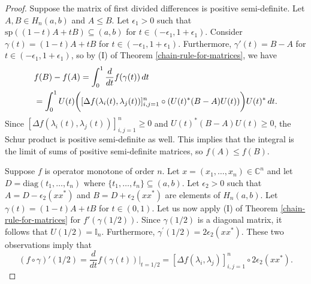 \documentclass[10pt,a4paper]{amsart}
\newcommand{\myabs}[1]{ | #1 | }
\begin{document}
	\begin{proof}
		Suppose the matrix of first divided differences is positive semi-definite. Let $A, B \in H_n(a, b)$ and $A \leq B$. Let $\epsilon_1 > 0$ such that $\text{sp}((1-t)A + tB) \subseteq (a, b)$ for $t \in (-\epsilon_1, 1 + \epsilon_1)$. Consider $\gamma(t) = (1-t)A + tB$ for $t \in (-\epsilon_1, 1 + \epsilon_1)$. Furthermore, $\gamma'(t) = B-A$ for $t \in (-\epsilon_1, 1 + \epsilon_1)$, so by (I) of Theorem \ref{chain-rule-for-matrices}, we have 
		\begin{align*}
			\begin{split}
				&f(B)-f(A) = \int_{0}^{1} \frac{d}{dt} f(\gamma(t)) \, \rm{d}t \\
				&= \int_{0}^{1} U(t) \bigg( [\Delta f(\lambda_i(t), \lambda_j(t))]_{i,j=1}^{n} \circ (U(t)^{*} (B-A) U(t)) \bigg)U(t)^{*} \, dt.
			\end{split}
		\end{align*}
		Since  $[\Delta f(\lambda_i(t), \lambda_j(t))]_{i,j=1}^{n}  \geq 0$ and $U(t)^{*} (B-A) U(t) \geq 0$, the Schur product is positive semi-definite as well. This implies that the integral is the limit of sums of positive semi-definite matrices, so $f(A) \leq f(B)$.
		\par 
		Suppose $f$ is operator monotone of order $n$. Let $x = (x_1, \ldots, x_n) \in \mathbb{C}^{n}$ and let $D = \text{diag}(t_1, \ldots, t_n)$ where $\lbrace t_1, \ldots, t_n \rbrace \subseteq (a, b)$. Let $\epsilon_2 > 0$ such that $A = D - \epsilon_2 (xx^{*})$ and  $B  = D + \epsilon_2 (xx^{*})$ are elements of $H_n(a,b)$. Let $\gamma(t) = (1-t) A + tB$ for $t \in (0,1)$. Let us now apply (I) of Theorem \ref{chain-rule-for-matrices} for $f'(\gamma(1/2))$.  Since  $\gamma(1/2)$ is a diagonal matrix, it follows that $U(1/2) = \mathbb{I}_n$. Furthermore,  $\gamma^{'}(1/2)= 2 \epsilon_2 (x x^{*})$. These two observations imply that
		\begin{equation*}\label{horn-th-6.6.36-eq1}
			(f \circ \gamma)'(1/2)  = \frac{d}{dt} f(\gamma(t)) \vert_{t=1/2} = [\Delta f(\lambda_i, \lambda_j)]_{i,j=1}^{n} \circ 2 \epsilon_2(x x^{*}).
		\end{equation*}
		
		
		

\end{proof}
\end{document}
